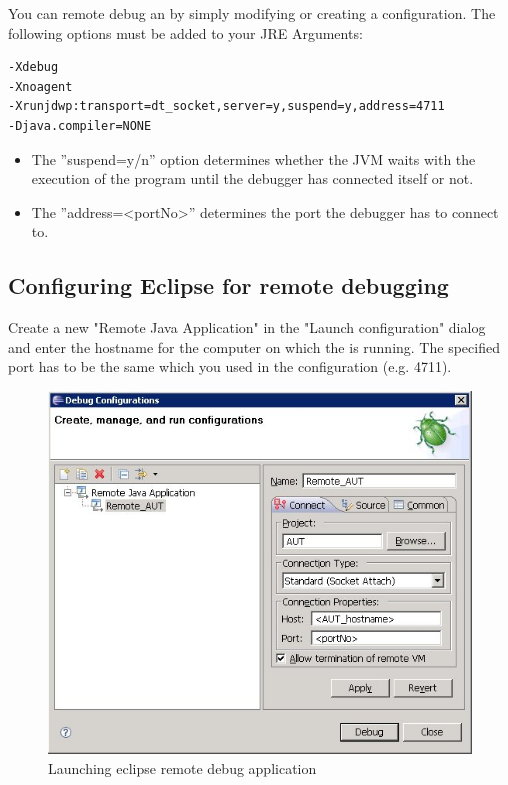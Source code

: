 You can remote debug an \gdaut{} by simply modifying or creating a \gdaut{} configuration. The following options must be added to your JRE Arguments:

\begin{verbatim}
-Xdebug 
-Xnoagent 
-Xrunjdwp:transport=dt_socket,server=y,suspend=y,address=4711 
-Djava.compiler=NONE 
\end{verbatim}

\begin{itemize}
 \item The ''suspend=y/n'' option determines whether the JVM waits with the execution of the program until the debugger has connected itself or not.
 \item The ''address=<portNo>'' determines the port the debugger has to connect to.
\end{itemize}


\subsection{Configuring Eclipse for remote debugging}
Create a new "Remote Java Application" in the "Launch configuration" dialog 
and enter the hostname for the computer on which the \gdagent{} is running. The specified port has to be the same which you used in the \gdaut{} configuration (e.g. 4711).

\begin{figure}[h]
\includegraphics[width=\textwidth]{Debugging/PS/eclipseRemoteDebug}
\caption{Launching eclipse remote debug application}
\label{EclipseRemoteDebugging}
\end{figure}

